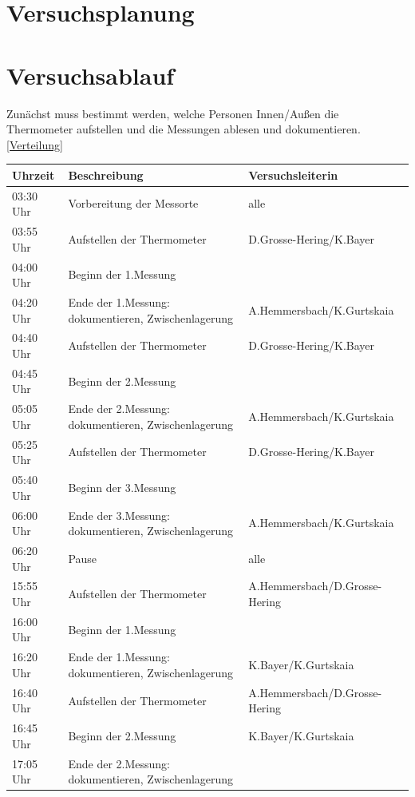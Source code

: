 \documentclass[ ngerman, fontsize= 12pt, paper=a4, headings=big, titlepage=true]{article}
\begin{document}
\section{Versuchsplanung}

\newpage
\section{Versuchsablauf}
Zunächst muss bestimmt werden, welche Personen Innen/Außen die Thermometer aufstellen und die Messungen ablesen und dokumentieren. \ref{Verteilung}
\begin{table}[h]
	\begin{tabular}{l|l|l}
		
		Uhrzeit		&	Beschreibung									&	Versuchsleiterin \\
		\hline
		03:30 Uhr	&	Vorbereitung der Messorte						& alle\\
		03:55 Uhr	&	Aufstellen der Thermometer						& D.Grosse-Hering/K.Bayer\\
		04:00 Uhr	&	Beginn der 1.Messung							& \\
		04:20 Uhr	& 	Ende der 1.Messung: dokumentieren, Zwischenlagerung & A.Hemmersbach/K.Gurtskaia\\
		
		04:40 Uhr	&	Aufstellen der Thermometer						&D.Grosse-Hering/K.Bayer\\
		04:45 Uhr	&	Beginn der 2.Messung							& \\
		05:05 Uhr	& 	Ende der 2.Messung: dokumentieren, Zwischenlagerung & A.Hemmersbach/K.Gurtskaia\\
		
		05:25 Uhr	&	Aufstellen der Thermometer						&D.Grosse-Hering/K.Bayer\\
		05:40 Uhr	&	Beginn der 3.Messung							& \\
		06:00 Uhr	& 	Ende der 3.Messung: dokumentieren, Zwischenlagerung & A.Hemmersbach/K.Gurtskaia\\
		
		\hline
		06:20 Uhr	& 	Pause											& alle \\
		\hline
		
		15:55 Uhr	&	Aufstellen der Thermometer						&A.Hemmersbach/D.Grosse-Hering\\
		16:00 Uhr	&	Beginn der 1.Messung							& \\
		16:20 Uhr	& 	Ende der 1.Messung: dokumentieren, Zwischenlagerung &K.Bayer/K.Gurtskaia \\
		
		16:40 Uhr	&	Aufstellen der Thermometer						&A.Hemmersbach/D.Grosse-Hering\\
		16:45 Uhr	&	Beginn der 2.Messung							&K.Bayer/K.Gurtskaia\\
		17:05 Uhr	& 	Ende der 2.Messung: dokumentieren, Zwischenlagerung &\\
		

\end{tabular}
\end{table}
\end{document}
